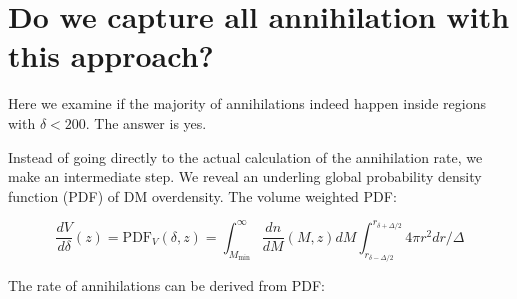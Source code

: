 \appendix

\section{Do we capture all annihilation with this approach?}

Here we examine if the majority of annihilations indeed happen inside regions with $\delta \lt 200$. The answer is yes.



Instead of going directly to the actual calculation of the annihilation rate, we make an intermediate step. We reveal an underling global probability density function (PDF) of DM overdensity. The volume weighted PDF:

\begin{equation}
\dfrac{dV}{d\delta}(z)=\mathrm{PDF}_V (\delta, z) = \int_{M_\mathrm{min}}^\infty \dfrac{dn}{dM}(M,z) dM \int_{r_{\delta-\Delta/2}}^{r_{\delta+\Delta/2}} 4\pi r^2 dr / \Delta
\end{equation}

The rate of annihilations can be derived from PDF:

